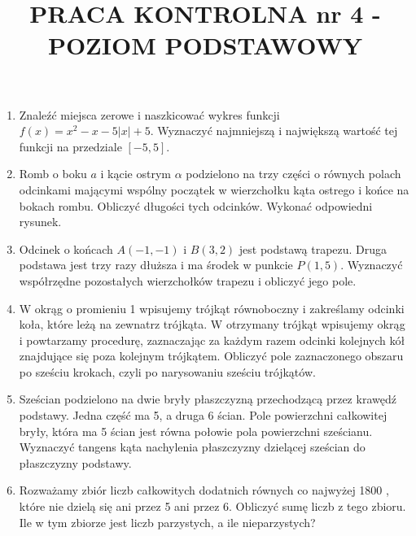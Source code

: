 \documentclass[10pt]{article}
\title{PRACA KONTROLNA nr 4 - POZIOM PODSTAWOWY }
\author{}
\date{}
\begin{document}
\maketitle
\begin{enumerate}
  \item Znaleźć miejsca zerowe i naszkicować wykres funkcji $f(x)=x^{2}-x-5|x|+5$. Wyznaczyć najmniejszą i największą wartość tej funkcji na przedziale $[-5,5]$.
  \item Romb o boku $a$ i kącie ostrym $\alpha$ podzielono na trzy części o równych polach odcinkami mającymi wspólny początek w wierzchołku kąta ostrego i końce na bokach rombu. Obliczyć długości tych odcinków. Wykonać odpowiedni rysunek.
  \item Odcinek o końcach $A(-1,-1)$ i $B(3,2)$ jest podstawą trapezu. Druga podstawa jest trzy razy dłuższa i ma środek w punkcie $P(1,5)$. Wyznaczyć współrzędne pozostałych wierzchołków trapezu i obliczyć jego pole.
  \item W okrąg o promieniu 1 wpisujemy trójkąt równoboczny i zakreślamy odcinki koła, które leżą na zewnatrz trójkąta. W otrzymany trójkąt wpisujemy okrąg i powtarzamy procedurę, zaznaczając za każdym razem odcinki kolejnych kół znajdujące się poza kolejnym trójkątem. Obliczyć pole zaznaczonego obszaru po sześciu krokach, czyli po narysowaniu sześciu trójkątów.
  \item Sześcian podzielono na dwie bryły płaszczyzną przechodzącą przez krawędź podstawy. Jedna część ma 5, a druga 6 ścian. Pole powierzchni całkowitej bryły, która ma 5 ścian jest równa połowie pola powierzchni sześcianu. Wyznaczyć tangens kąta nachylenia płaszczyzny dzielącej sześcian do płaszczyzny podstawy.
  \item Rozważamy zbiór liczb całkowitych dodatnich równych co najwyżej 1800 , które nie dzielą się ani przez 5 ani przez 6. Obliczyć sumę liczb z tego zbioru. Ile w tym zbiorze jest liczb parzystych, a ile nieparzystych?
\end{enumerate}
\end{document}
